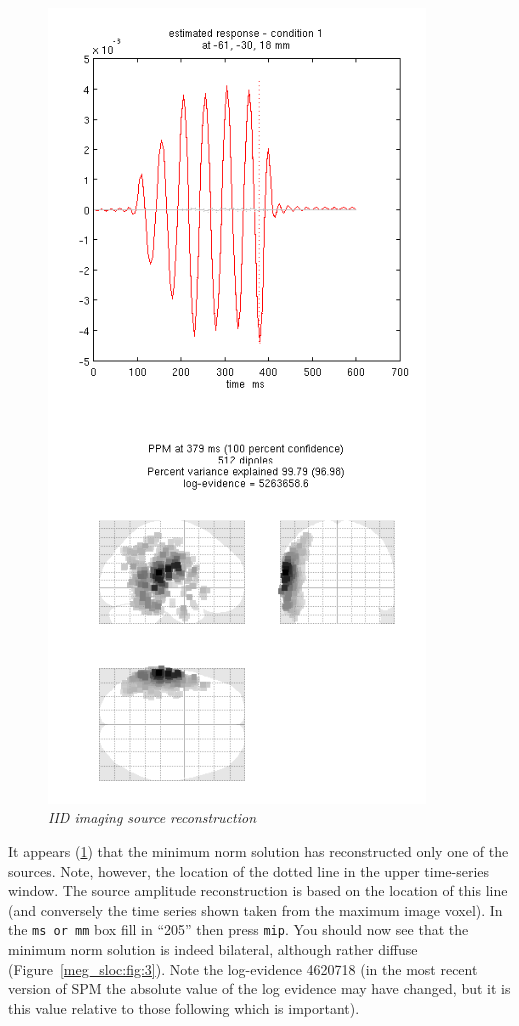\begin{figure}
\begin{center}
\includegraphics[width=100mm]{meg_sloc/slide2}
\caption{\em IID imaging source reconstruction \label{meg_sloc:fig:2}}
\end{center}
\end{figure}

 
It appears (\ref{meg_sloc:fig:2}) that the minimum norm solution has reconstructed only one of the sources. Note, however, the location of the dotted line in the upper time-series window. The source amplitude reconstruction is based on the location of this line (and conversely the time series shown taken from the maximum image voxel). In the \texttt{ms or mm} box fill in ``205'' then press \texttt{mip}. You should now see that the minimum norm solution is indeed bilateral, although rather diffuse (Figure~\ref{meg_sloc:fig:3}).  Note the log-evidence 4620718 (in the most recent version of SPM the absolute value of the log evidence may have changed, but it is this value relative to those following which is important).

